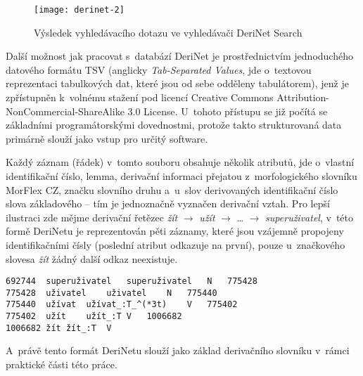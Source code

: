 \begin{figure}[ht]   
    \centering
    \texttt{[image: derinet-2]}  
    \caption{Výsledek vyhledávacího dotazu ve vyhledávači DeriNet Search~\parencite{derinet}}
    \label{derinet-2}
 \end{figure}

Další možnost jak pracovat s~databází DeriNet je prostřednictvím
jednoduchého datového formátu TSV (anglicky \emph{Tab-Separated Values},
jde o~textovou reprezentaci tabulkových dat, které jsou od sebe odděleny
tabulátorem), jenž je zpřístupněn k~volnému stažení pod licencí Creative
Commons Attribution-NonCommercial-ShareAlike 3.0 License. U~tohoto
přístupu se již počítá se základními programátorskými dovednostmi,
protože takto strukturovaná data primárně slouží jako vstup pro určitý
software.~\parencite{derinet-cz}

Každý záznam (řádek) v~tomto souboru obsahuje několik atributů, jde
o~vlastní identifikační číslo, lemma, derivační informaci přejatou
z~morfologického slovníku MorFlex CZ, značku slovního druhu a~u~slov
derivovaných identifikační číslo slova základového -- tím je jednoznačně
vyznačen derivační vztah. Pro lepší ilustraci zde mějme derivační
řetězec \emph{žít} $\rightarrow$ \emph{užít} $\rightarrow$
\ldots{} $\rightarrow$ \emph{superuživatel}, v~této formě DeriNetu je
reprezentován pěti záznamy, které jsou vzájemně propojeny
identifikačními čísly (poslední atribut odkazuje na první), pouze
u~značkového slovesa \emph{žít} žádný další odkaz neexistuje.
\parencite{derinet}

\begin{verbatim}
692744  superuživatel   superuživatel   N   775428
775428  uživatel    uživatel    N   775440
775440  užívat  užívat_:T_^(*3t)    V   775402
775402  užít    užít_:T V   1006682
1006682 žít žít_:T  V
\end{verbatim}

A~právě tento formát DeriNetu slouží jako základ derivačního slovníku
v~rámci praktické části této práce.
